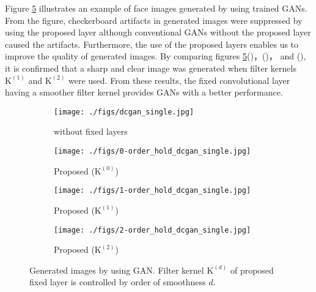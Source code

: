 \documentclass{article}
\newcommand{\mytensor}[1]{\boldsymbol{\mathrm{#1}}}
\begin{document}
  Figure \ref{fig:generation} illustrates an example of face images generated
  by using trained GANs.
  From the figure, checkerboard artifacts in generated images were suppressed
  by using the proposed layer
  although conventional GANs without the proposed layer caused the artifacts.
  Furthermore, the use of the proposed layers enables us to
  improve the quality of generated images.
  By comparing
  figures \ref{fig:generation}()，()，
  and (),
  it is confirmed that a sharp and clear image was generated when
  filter kernels $\mytensor{K}^{(1)}$ and $\mytensor{K}^{(2)}$ were used.
  From these results,
  the fixed convolutional layer having a smoother filter kernel
  provides GANs with a better performance.
\begin{figure}[!t]
  \centering
  \begin{subfigure}[t]{0.24\hsize}
    \centering
    \texttt{[image: ./figs/dcgan\_single.jpg]}
    \caption{without fixed layers \label{fig:conv_gan}}
  \end{subfigure}
  \begin{subfigure}[t]{0.24\hsize}
    \centering
    \texttt{[image: ./figs/0-order\_hold\_dcgan\_single.jpg]}
    \caption{Proposed ($\mytensor{K}^{(0)}$) \label{fig:prop_gan_0}}
  \end{subfigure}
  \begin{subfigure}[t]{0.24\hsize}
    \centering
    \texttt{[image: ./figs/1-order\_hold\_dcgan\_single.jpg]}
    \caption{Proposed ($\mytensor{K}^{(1)}$) \label{fig:prop_gan_1}}
  \end{subfigure}
  \begin{subfigure}[t]{0.24\hsize}
    \centering
    \texttt{[image: ./figs/2-order\_hold\_dcgan\_single.jpg]}
    \caption{Proposed ($\mytensor{K}^{(2)}$) \label{fig:prop_gan_2}}
  \end{subfigure}
  \vspace{-2ex}
  \caption{Generated images by using GAN.
    Filter kernel $\mytensor{K}^{(d)}$ of proposed fixed layer
    is controlled by order of smoothness $d$.
    \label{fig:generation}}
\end{figure}
\end{document}
